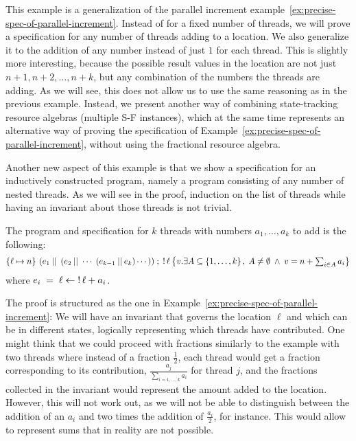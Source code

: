 \begin{example}
  \label{example:parallel-add}
  This example is a generalization of the parallel increment example~\ref{ex:precise-spec-of-parallel-increment}.
  Instead of for a fixed number of threads, we will prove a specification for any number of threads adding to a location.
  We also generalize it to the addition of any number instead of just $1$ for each thread.
  This is slightly more interesting, because the possible result values in the location are not just $n+1, n+2, \ldots, n+k$, but any combination of the numbers the threads are adding.
  As we will see, this does not allow us to use the same reasoning as in the previous example.
  Instead, we present another way of combining state-tracking resource algebras (multiple S-F instances), which at the same time represents an alternative way of proving the specification of Example~\ref{ex:precise-spec-of-parallel-increment}, without using the fractional resource algebra.

  Another new aspect of this example is that we show a specification for an inductively constructed program, namely a program consisting of any number of nested threads. As we will see in the proof, induction on the list of threads while having an invariant about those threads is not trivial.

  The program and specification for $k$ threads with numbers $a_1, \ldots, a_k$ to add is the following:
  \newcommand{\paralleladdprog}[1][k]{\left(e_1 \parcomp\;(e_2 \parcomp\;\cdots\;(e_{#1-1} \parcomp e_{#1})\cdots\right))}
  \begin{align}
    \label{eq:parallel-add-spec}
    \hoare{\ell \pointsto n}
    {\paralleladdprog \; ; \; \deref \ell}
    {v. \exists A \subseteq \{1,\dots,k\}\,,\; A \neq \emptyset \;\land\; v = n + \textstyle\sum_{i \in A}{a_i} }
  \end{align}
  where $e_i \;=\; \ell \leftarrow \mathop{!} \ell + a_i$.

  The proof is structured as the one in Example~\ref{ex:precise-spec-of-parallel-increment}:
  We will have an invariant that governs the location $\ell$ and which can be in different states, logically representing which threads have contributed.
  One might think that we could proceed with fractions similarly to the example with two threads where instead of a fraction $\frac{1}{2}$, each thread would get a fraction corresponding to its contribution, \ie{} $\frac{a_j}{\sum_{i=1,\dots,k} a_i}$ for thread $j$, and the fractions collected in the invariant would represent the amount added to the location.
  However, this will not work out, as we will not be able to distinguish between the addition of an $a_i$ and two times the addition of $\frac{a_i}{2}$, for instance.
  This would allow to represent sums that in reality are not possible.


\end{example}
